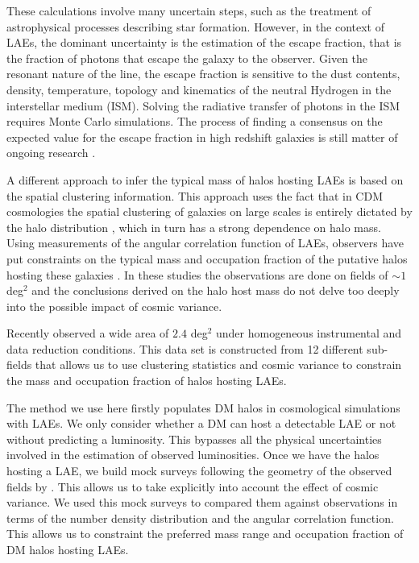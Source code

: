 \documentclass[usenatbib]{mn2e}
\newcommand{\ly}{{\ifmmode{{\rm Ly}\alpha}\else{Ly$\alpha$~}\fi}}
\begin{document}
These calculations involve many uncertain steps, such as the treatment
of astrophysical processes describing star formation. However, in the
context of LAEs, the dominant uncertainty is the estimation of the
escape fraction, that is the fraction of \ly photons that escape the
galaxy to the observer. Given the resonant nature of the \ly line, the escape
fraction is sensitive to  the dust contents, density, temperature, topology and
kinematics of the neutral Hydrogen in the interstellar medium
(ISM). Solving the radiative transfer of \ly photons in the ISM requires Monte
Carlo simulations. The process of finding a consensus on the expected
value for the \ly escape fraction in high redshift galaxies is still
matter of ongoing research
\citep{Neufeld1991,Verhamme2006,ForeroRomero2011,Dijkstra2012,Laursen2013,Orsi2012}.  

A different approach to infer the typical mass of halos hosting
LAEs is based on the spatial clustering information. This approach uses the fact
that in CDM cosmologies the spatial clustering of galaxies on large
scales is entirely dictated by the halo distribution
\citep{Colberg00}, which in turn has a strong dependence on halo
mass. Using measurements of the angular correlation function of LAEs,
observers have put constraints on the typical mass and occupation
fraction of the putative halos hosting these galaxies
\citep{Hayashino2004,Gawiser07,Nilsson2007,Ouchi2010}. In these
studies the observations are done on fields of $\sim 1$ deg$^{2}$ and
the conclusions derived on the halo host mass do not delve too deeply
into the possible impact of cosmic variance.  

Recently \cite{Yamada2012} observed a wide area of $2.4$ deg$^{2}$
under homogeneous instrumental and data reduction conditions. This data
set is constructed from 12 different sub-fields that allows us to use
clustering statistics and cosmic variance to constrain the mass and
occupation fraction of halos hosting LAEs. 

The method we use here firstly populates DM halos in cosmological
simulations with LAEs. We only consider whether a DM can host a
detectable LAE or not without predicting a \ly  luminosity. This
bypasses all the physical uncertainties involved in the estimation of
observed \ly luminosities. Once we have the halos hosting a LAE, we
build mock surveys following the geometry of the observed fields by
\cite{Yamada2012}. This allows us to take explicitly into account the
effect of cosmic variance. We used this mock surveys to compared them
against observations in terms of the number density distribution and
the angular correlation function. This allows us to constraint the
preferred mass range and occupation fraction of DM halos hosting LAEs.    
 
\end{document}
